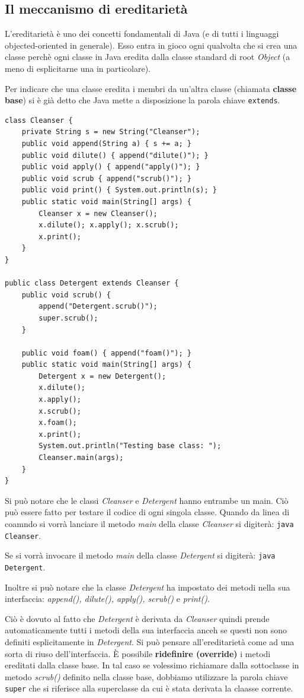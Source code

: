 \documentclass[12pt]{report}
\begin{document}
\subsection{Il meccanismo di ereditarietà}
L'ereditarietà è uno dei concetti fondamentali di Java (e di tutti i linguaggi objected-oriented in generale). Esso entra in gioco ogni qualvolta che si crea una classe perchè ogni classe in Java eredita dalla classe standard di root \textit{Object} (a meno di esplicitarne una in particolare).

Per indicare che una classe eredita i membri da un'altra classe (chiamata \textbf{classe base}) si è già detto che Java mette a disposizione la parola chiave \texttt{extends}.
\begin{lstlisting}[style=javastyle]
class Cleanser {
	private String s = new String("Cleanser");
	public void append(String a) { s += a; }
	public void dilute() { append("dilute()"); }
	public void apply() { append("apply()"); }
	public void scrub { append("scrub()"); }
	public void print() { System.out.println(s); }
	public static void main(String[] args) {
		Cleanser x = new Cleanser();
		x.dilute(); x.apply(); x.scrub();
		x.print();
	}
}

public class Detergent extends Cleanser {
	public void scrub() {
		append("Detergent.scrub()");
		super.scrub();
	}

	public void foam() { append("foam()"); }
	public static void main(String[] args) {
		Detergent x = new Detergent();
		x.dilute();
		x.apply();
		x.scrub();
		x.foam();
		x.print();
		System.out.println("Testing base class: ");
		Cleanser.main(args);
	}
}
\end{lstlisting}
Si può notare che le classi \textit{Cleanser} e \textit{Detergent} hanno entrambe un main. Ciò può essere fatto per testare il codice di ogni singola classe. Quando da linea di coamndo si vorrà lanciare il metodo \textit{main} della classe \textit{Cleanser} si digiterà: \texttt{java Cleanser}.

Se si vorrà invocare il metodo \textit{main} della classe \textit{Detergent} si digiterà: \texttt{java Detergent}.

Inoltre si può notare che la classe \textit{Detergent} ha impostato dei metodi nella sua interfaccia: \textit{append(), dilute(), apply(), scrub()} e \textit{print()}.

Ciò è dovuto al fatto che \textit{Detergent} è derivata da \textit{Cleanser} quindi prende automaticamente tutti i metodi della sua interfaccia anceh se questi non sono definiti esplicitamente in \textit{Detergent}. Si può pensare all'ereditarietà come ad una sorta di riuso dell'interfaccia. È possibile \textbf{ridefinire (override)} i metodi ereditati dalla classe base. In tal caso se volessimo richiamare dalla sottoclasse in metodo \textit{scrub()} definito nella classe base, dobbiamo utilizzare la parola chiave \texttt{super} che si riferisce alla superclasse da cui è stata derivata la claasse corrente.
\end{document}
